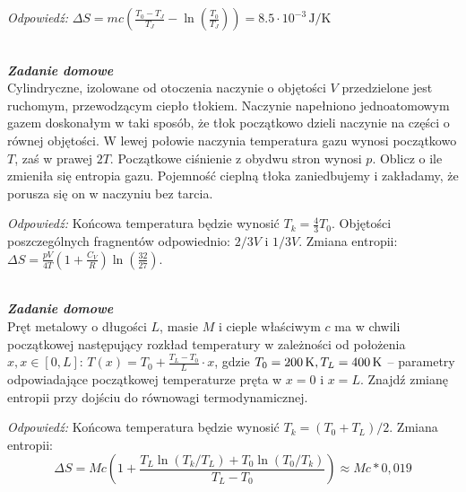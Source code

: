 \documentclass[11pt,a4paper]{article}
\renewcommand{\t}[1]{\textrm{#1}}
\newcounter{zaddom}\newcommand{\zaddom}[1][]{\addtocounter{zaddom}{1} ~\\  {\bf \emph{Zadanie domowe \arabic{zaddom} #1 }} \\}
\renewcommand{\t}[1]{\textrm{#1}}
\begin{document}
\noindent
\emph{Odpowiedź:}
$\Delta S = mc \left( \frac{T_0 - T_J}{T_J}  - \ln\left(\frac{T_0}{T_J}\right)  \right) = 8.5 \cdot 10^{-3}\, \t{J/K}$

\zaddom
Cylindryczne, izolowane od otoczenia naczynie o objętości $V$ przedzielone jest ruchomym,
przewodzącym ciepło tłokiem. Naczynie napełniono jednoatomowym gazem doskonałym w
taki sposób, że tłok początkowo dzieli naczynie na części o równej objętości. W lewej
połowie naczynia temperatura gazu wynosi początkowo $T$, zaś w prawej $2T$. Początkowe
ciśnienie z obydwu stron wynosi $p$.
Oblicz o ile zmieniła się entropia gazu.
Pojemność cieplną tłoka zaniedbujemy i zakładamy, że porusza się on w naczyniu bez tarcia.
\newline

\noindent
\emph{Odpowiedź:} Końcowa temperatura będzie wynosić $T_k = \frac{4}{3} T_0$. Objętości poszczególnych fragnentów odpowiednio: $2/3 V$ i $1/3 V$. Zmiana entropii: $\Delta S=\frac{p V}{4 T} \left(1 + \frac{C_V}{R}  \right)\ln\left(\frac{32}{27}\right)$.

\newpage

\zaddom
Pręt metalowy o długości $L$, masie $M$ i cieple właściwym $c$ ma w chwili początkowej
następujący rozkład temperatury w zależności od położenia $x, x\in[0,L]$:
$T(x)=T_0+ \frac{T_L-T_0}{L} \cdot x$, gdzie $T_0=200\,{\rm K}, T_L=400\,{\rm K}$ -- parametry
odpowiadające początkowej temperaturze pręta w $x=0$ i $x=L$.
Znajdź zmianę entropii przy dojściu do równowagi termodynamicznej.
\newline

\noindent
\emph{Odpowiedź:} Końcowa temperatura będzie wynosić $T_k = (T_0+T_L)/2$. 
Zmiana entropii: $$\Delta S = M c \left(1  + \frac{T_L \ln(T_k/T_L) + T_0 \ln(T_0/T_k)}{T_L - T_0}   \right)  \approx M c * 0,019$$
\end{document}
